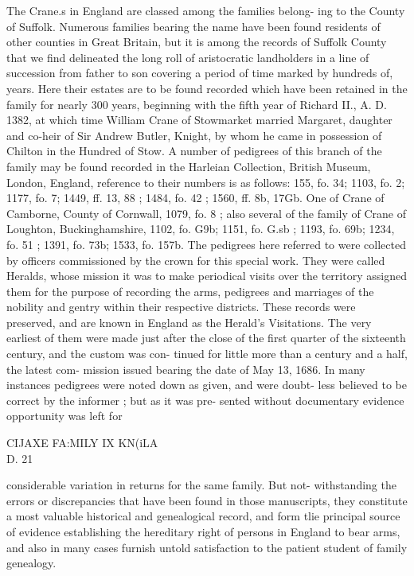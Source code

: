 \documentclass{book}
\begin{document}
The Crane.s in England are classed among the families belong- 
ing to the County of Suffolk. Numerous families bearing the 
name have been found residents of other counties in Great 
Britain, but it is among the records of Suffolk County that we 
find delineated the long roll of aristocratic landholders in a line 
of succession from father to son covering a period of time marked 
by hundreds of, years. Here their estates are to be found recorded 
which have been retained in the family for nearly 300 years, 
beginning with the fifth year of Richard II., A. D. 1382, at 
which time William Crane of Stowmarket married Margaret, 
daughter and co-heir of Sir Andrew Butler, Knight, by whom he 
came in possession of Chilton in the Hundred of Stow. A number 
of pedigrees of this branch of the family may be found recorded 
in the Harleian Collection, British Museum, London, England, 
reference to their numbers is as follows: 155, fo. 34; 1103, fo. 
2; 1177, fo. 7; 1449, ff. 13, 88 ; 1484, fo. 42 ; 1560, ff. 8b, 17Gb. 
One of Crane of Camborne, County of Cornwall, 1079, fo. 8 ; also 
several of the family of Crane of Loughton, Buckinghamshire, 
1102, fo. G9b; 1151, fo. G.sb ; 1193, fo. 69b; 1234, fo. 51 ; 1391, 
fo. 73b; 1533, fo. 157b. The pedigrees here referred to were 
collected by officers commissioned by the crown for this special 
work. They were called Heralds, whose mission it was to make 
periodical visits over the territory assigned them for the purpose 
of recording the arms, pedigrees and marriages of the nobility 
and gentry within their respective districts. These records were 
preserved, and are known in England as the Herald's Visitations. 
The very earliest of them were made just after the close of the 
first quarter of the sixteenth century, and the custom was con- 
tinued for little more than a century and a half, the latest com- 
mission issued bearing the date of May 13, 1686. In many 
instances pedigrees were noted down as given, and were doubt- 
less believed to be correct by the informer ; but as it was pre- 
sented without documentary evidence opportunity was left for 



CIJAXE FA:MILY IX KN(iLA\\D. 21 

considerable variation in returns for the same family. But not- 
withstanding the errors or discrepancies that have been found in 
those manuscripts, they constitute a most valuable historical and 
genealogical record, and form tlie principal source of evidence 
establishing the hereditary right of persons in England to bear 
arms, and also in many cases furnish untold satisfaction to the 
patient student of family genealogy. 
\end{document}
